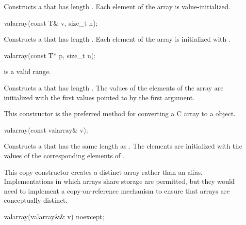 \begin{itemdescr}
\pnum
\effects
Constructs a  that has length .
Each element of the array is value-initialized.
\end{itemdescr}

%
\begin{itemdecl}
valarray(const T& v, size_t n);
\end{itemdecl}

\begin{itemdescr}
\pnum
\effects
Constructs a  that has length .
Each element of the array is initialized with .
\end{itemdescr}

%
\begin{itemdecl}
valarray(const T* p, size_t n);
\end{itemdecl}

\begin{itemdescr}

\pnum
\expects
{} is a valid range.

\pnum
\effects
Constructs a  that has length .
The values of the elements of the array are initialized with the
first
values pointed to by the first argument.
\begin{footnote}
This constructor is the
preferred method for converting a C array to a
object.
\end{footnote}
\end{itemdescr}

%
\begin{itemdecl}
valarray(const valarray& v);
\end{itemdecl}

\begin{itemdescr}
\pnum
\effects
Constructs a  that has the same length as .
The elements are initialized with the values of the corresponding
elements of .
\begin{footnote}
This copy constructor creates
a distinct array rather than an alias.
Implementations in which arrays share storage are permitted, but they
would need to implement a copy-on-reference mechanism to ensure that arrays are
conceptually distinct.
\end{footnote}
\end{itemdescr}

%
\begin{itemdecl}
valarray(valarray&& v) noexcept;
\end{itemdecl}

